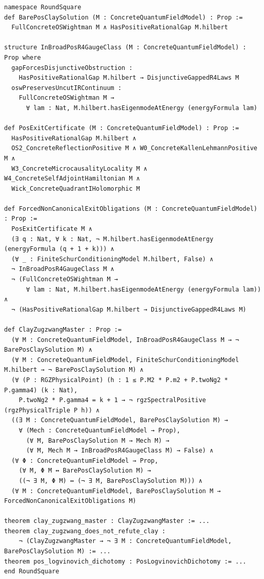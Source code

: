 \documentclass[11pt,a4paper]{article}
\theoremstyle{plain}
\theoremstyle{definition}
\theoremstyle{remark}
\renewcommand{\_}{\oldunderscore\allowbreak}
\begin{document}
\begin{lstlisting}
namespace RoundSquare
def BarePosClaySolution (M : ConcreteQuantumFieldModel) : Prop :=
  FullConcreteOSWightman M ∧ HasPositiveRationalGap M.hilbert

structure InBroadPosR4GaugeClass (M : ConcreteQuantumFieldModel) : Prop where
  gapForcesDisjunctiveObstruction :
    HasPositiveRationalGap M.hilbert → DisjunctiveGappedR4Laws M
  oswPreservesUncutIRContinuum :
    FullConcreteOSWightman M →
      ∀ lam : Nat, M.hilbert.hasEigenmodeAtEnergy (energyFormula lam)

def PosExitCertificate (M : ConcreteQuantumFieldModel) : Prop :=
  HasPositiveRationalGap M.hilbert ∧
  OS2_ConcreteReflectionPositive M ∧ W0_ConcreteKallenLehmannPositive M ∧
  W3_ConcreteMicrocausalityLocality M ∧ W4_ConcreteSelfAdjointHamiltonian M ∧
  Wick_ConcreteQuadrantIHolomorphic M

def ForcedNonCanonicalExitObligations (M : ConcreteQuantumFieldModel) : Prop :=
  PosExitCertificate M ∧
  (∃ q : Nat, ∀ k : Nat, ¬ M.hilbert.hasEigenmodeAtEnergy (energyFormula (q + 1 + k))) ∧
  (∀ _ : FiniteSchurConditioningModel M.hilbert, False) ∧
  ¬ InBroadPosR4GaugeClass M ∧
  ¬ (FullConcreteOSWightman M →
      ∀ lam : Nat, M.hilbert.hasEigenmodeAtEnergy (energyFormula lam)) ∧
  ¬ (HasPositiveRationalGap M.hilbert → DisjunctiveGappedR4Laws M)

def ClayZugzwangMaster : Prop :=
  (∀ M : ConcreteQuantumFieldModel, InBroadPosR4GaugeClass M → ¬ BarePosClaySolution M) ∧
  (∀ M : ConcreteQuantumFieldModel, FiniteSchurConditioningModel M.hilbert → ¬ BarePosClaySolution M) ∧
  (∀ (P : RGZPhysicalPoint) (h : 1 ≤ P.M2 * P.m2 + P.twoNg2 * P.gamma4) (k : Nat),
    P.twoNg2 * P.gamma4 = k + 1 → ¬ rgzSpectralPositive (rgzPhysicalTriple P h)) ∧
  ((∃ M : ConcreteQuantumFieldModel, BarePosClaySolution M) →
    ∀ (Mech : ConcreteQuantumFieldModel → Prop),
      (∀ M, BarePosClaySolution M → Mech M) →
      (∀ M, Mech M → InBroadPosR4GaugeClass M) → False) ∧
  (∀ Φ : ConcreteQuantumFieldModel → Prop,
    (∀ M, Φ M ↔ BarePosClaySolution M) →
    ((¬ ∃ M, Φ M) ↔ (¬ ∃ M, BarePosClaySolution M))) ∧
  (∀ M : ConcreteQuantumFieldModel, BarePosClaySolution M → ForcedNonCanonicalExitObligations M)

theorem clay_zugzwang_master : ClayZugzwangMaster := ...
theorem clay_zugzwang_does_not_refute_clay :
    ¬ (ClayZugzwangMaster → ¬ ∃ M : ConcreteQuantumFieldModel, BarePosClaySolution M) := ...
theorem pos_logvinovich_dichotomy : PosLogvinovichDichotomy := ...
end RoundSquare
\end{lstlisting}
\end{document}
